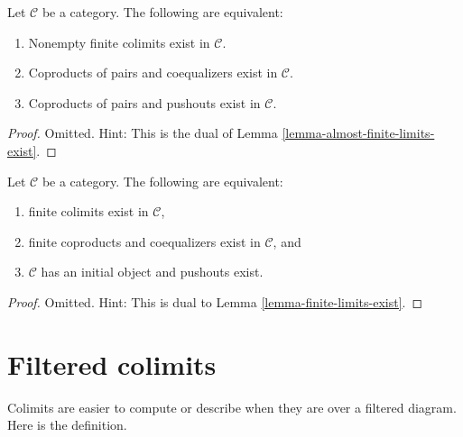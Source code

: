 \begin{lemma}
\label{lemma-almost-finite-colimits-exist}
Let $\mathcal{C}$ be a category.
The following are equivalent:
\begin{enumerate}
\item Nonempty finite colimits exist in $\mathcal{C}$.
\item Coproducts of pairs and coequalizers exist in $\mathcal{C}$.
\item Coproducts of pairs and pushouts exist in $\mathcal{C}$.
\end{enumerate}
\end{lemma}

\begin{proof}
Omitted. Hint: This is the dual of
Lemma \ref{lemma-almost-finite-limits-exist}.
\end{proof}

\begin{lemma}
\label{lemma-colimits-exist}
Let $\mathcal{C}$ be a category.
The following are equivalent:
\begin{enumerate}
\item finite colimits exist in $\mathcal{C}$,
\item finite coproducts and coequalizers exist in $\mathcal{C}$, and
\item $\mathcal{C}$ has an initial object and pushouts exist.
\end{enumerate}
\end{lemma}

\begin{proof}
Omitted. Hint: This is dual to Lemma \ref{lemma-finite-limits-exist}.
\end{proof}





\section{Filtered colimits}
\label{section-directed-colimits}

\noindent
Colimits are easier to compute or describe when they
are over a filtered diagram. Here is the definition.

